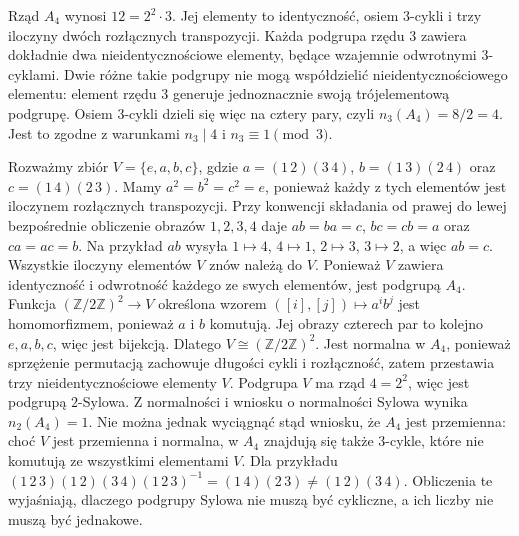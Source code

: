 \begin{przyklad}
\label{aa:prz:sylow-a4}
Rząd $A_4$ wynosi $12=2^2\cdot3$.
Jej elementy to identyczność, osiem $3$-cykli
i trzy iloczyny dwóch rozłącznych transpozycji.
Każda podgrupa rzędu $3$ zawiera dokładnie dwa
nieidentycznościowe elementy, będące wzajemnie odwrotnymi
$3$-cyklami. Dwie różne takie podgrupy nie mogą współdzielić
nieidentycznościowego elementu: element rzędu $3$
generuje jednoznacznie swoją trójelementową podgrupę.
Osiem $3$-cykli dzieli się więc na cztery pary,
czyli $n_3(A_4)=8/2=4$.
Jest to zgodne z warunkami $n_3\mid4$ i $n_3\equiv1\pmod3$.

Rozważmy zbiór
$V=\{e,a,b,c\}$, gdzie
$a=(1\,2)(3\,4)$, $b=(1\,3)(2\,4)$ oraz
$c=(1\,4)(2\,3)$.
Mamy $a^2=b^2=c^2=e$, ponieważ każdy z tych elementów
jest iloczynem rozłącznych transpozycji.
Przy konwencji składania od prawej do lewej bezpośrednie
obliczenie obrazów $1,2,3,4$ daje
$ab=ba=c$, $bc=cb=a$ oraz $ca=ac=b$.
Na przykład $ab$ wysyła $1\mapsto4$, $4\mapsto1$,
$2\mapsto3$, $3\mapsto2$, a więc $ab=c$.
Wszystkie iloczyny elementów $V$ znów należą do $V$.
Ponieważ $V$ zawiera identyczność i odwrotność każdego
ze swych elementów, jest podgrupą $A_4$.
Funkcja $(\mathbb Z/2\mathbb Z)^2\to V$ określona wzorem
$([i],[j])\mapsto a^i b^j$ jest homomorfizmem,
ponieważ $a$ i $b$ komutują. Jej obrazy czterech par
to kolejno $e,a,b,c$, więc jest bijekcją.
Dlatego $V\cong(\mathbb Z/2\mathbb Z)^2$.
Jest normalna w $A_4$, ponieważ sprzężenie permutacją
zachowuje długości cykli i rozłączność, zatem przestawia
trzy nieidentycznościowe elementy $V$.
Podgrupa $V$ ma rząd $4=2^2$, więc jest podgrupą $2$-Sylowa.
Z normalności i wniosku o normalności Sylowa wynika $n_2(A_4)=1$.
Nie można jednak wyciągnąć stąd wniosku, że $A_4$ jest
przemienna: choć $V$ jest przemienna i normalna,
w $A_4$ znajdują się także $3$-cykle, które nie komutują
ze wszystkimi elementami $V$. Dla przykładu
$(1\,2\,3)(1\,2)(3\,4)(1\,2\,3)^{-1}
=(1\,4)(2\,3)\ne (1\,2)(3\,4)$.
Obliczenia te wyjaśniają, dlaczego podgrupy Sylowa
nie muszą być cykliczne, a ich liczby nie muszą być jednakowe.
\end{przyklad}

